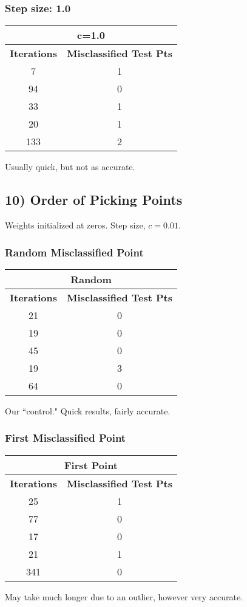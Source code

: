 \documentclass{article}
\begin{document}
\subsubsection*{Step size: 1.0}
\begin{center}
\begin{tabular}{|c|c|}
	\hline
	\multicolumn{2}{|c|}{\textbf{c=1.0}} \\\hline
	\textbf{Iterations} & \textbf{Misclassified Test Pts} \\\hline
	7 & 1 \\
	94 & 0\\
	33 & 1 \\
	20 & 1\\
	133 & 2\\
	\hline
\end{tabular}
\end{center}
Usually quick, but not as accurate.

\newpage
\subsection*{10) Order of Picking Points}
Weights initialized at zeros. Step size, $c = 0.01$.


\subsubsection*{Random Misclassified Point}
\begin{center}
\begin{tabular}{|c|c|}
	\hline
	\multicolumn{2}{|c|}{\textbf{Random}} \\\hline
	\textbf{Iterations} & \textbf{Misclassified Test Pts} \\\hline
	21 & 0 \\
	19 & 0\\
	45 & 0 \\
	19 & 3\\
	64 & 0\\
	\hline
\end{tabular}
\end{center}
Our ``control." Quick results, fairly accurate.


\subsubsection*{First Misclassified Point}
\begin{center}
\begin{tabular}{|c|c|}
	\hline
	\multicolumn{2}{|c|}{\textbf{First Point}} \\\hline
	\textbf{Iterations} & \textbf{Misclassified Test Pts} \\\hline
	25 & 1 \\
	77 & 0\\
	17 & 0 \\
	21 & 1\\
	341 & 0\\
	\hline
\end{tabular}
\end{center}
May take much longer due to an outlier, however very accurate.
\end{document}
